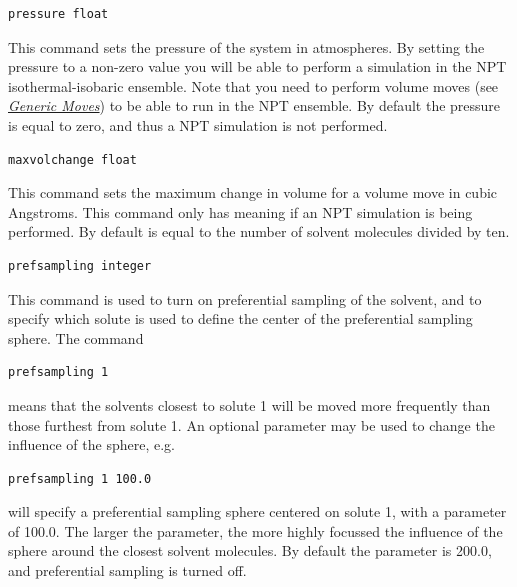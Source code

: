 \documentclass[letterpaper,10pt,english]{sphinxmanual}
\begin{document}
\begin{Verbatim}[frame=single,commandchars=\\\{\}]
pressure float
\end{Verbatim}

This command sets the pressure of the system in atmospheres. By setting the pressure to a non-zero value you will be able to perform a simulation in the NPT isothermal-isobaric ensemble. Note that you need to perform volume moves (see {\hyperref[protoms:moves]{\emph{Generic Moves}}}) to be able to run in the NPT ensemble. By default the pressure is equal to zero, and thus a NPT simulation is not performed.

\begin{Verbatim}[frame=single,commandchars=\\\{\}]
maxvolchange float
\end{Verbatim}

This command sets the maximum change in volume for a volume move in cubic Angstroms. This command only has meaning if an NPT simulation is being performed. By default  is equal to the number of solvent molecules divided by ten.

\begin{Verbatim}[frame=single,commandchars=\\\{\}]
prefsampling integer
\end{Verbatim}

This command is used to turn on preferential sampling of the solvent, and to specify which solute is used to define the center of the preferential sampling sphere. The command

\begin{Verbatim}[frame=single,commandchars=\\\{\}]
prefsampling 1
\end{Verbatim}

means that the solvents closest to solute 1 will be moved more frequently than those furthest from solute 1. An optional parameter may be used to change the influence of the sphere, e.g.

\begin{Verbatim}[frame=single,commandchars=\\\{\}]
prefsampling 1 100.0
\end{Verbatim}

will specify a preferential sampling sphere centered on solute 1, with a parameter of 100.0. The larger the parameter, the more highly focussed the influence of the sphere around the closest solvent molecules. By default the parameter is 200.0, and preferential sampling is turned off.
\end{document}
